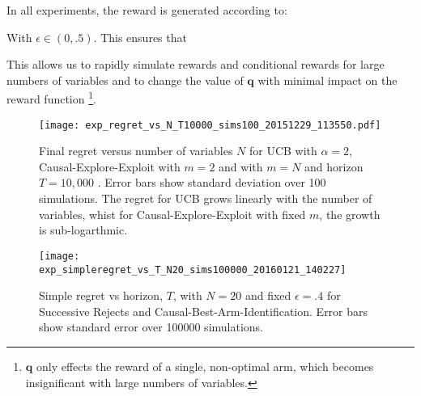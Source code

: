 In all experiments, the reward is generated according to:

With $\epsilon \in (0,.5)$. This ensures that 

This allows us to rapidly simulate rewards and conditional rewards for large numbers of variables and to change the value of $\boldsymbol{q}$ with minimal impact on the reward function \footnote{$\boldsymbol{q}$ only effects the reward of a single, non-optimal arm, which becomes insignificant with large numbers of variables.}. 

\begin{figure}
\caption{Final regret versus number of variables $N$ for UCB with $\alpha = 2$, Causal-Explore-Exploit with $m=2$ and with $m=N$ and horizon $T = 10,000$ . Error bars show standard deviation over 100 simulations. The regret for UCB grows linearly with the number of variables, whist for Causal-Explore-Exploit with fixed $m$, the growth is sub-logarthmic.  }
\label{fig:known_q_r_vs_N}
\centering
\texttt{[image: exp\_regret\_vs\_N\_T10000\_sims100\_20151229\_113550.pdf]}
\end{figure}

\iffalse
\begin{figure}
\caption{Cumulative regret over time for $N = 17$ for UCB with $\alpha=2$, Causal-Explore-Exploit with $m=2$ and Causal-Explore-Exploit with $m=N$. Shaded region shows standard deviation over 100 simulations. The Causal-Explore-Exploit algorithm incurs linear regret during the exploration phase, after which it selects the optimal arm with high probability. For $m=2$, we have $K \sim m^{2/3}T^{1/3}$ and see that we are in the regime in which Causal-Explore-Exploit outperforms UCB.}
\label{fig:known_q_r_vs_t}
\centering
\texttt{[image: exp\_regret\_vs\_t\_T10000\_N17\_sims100\_20151229\_120647.pdf]}
\end{figure}
\fi

\begin{figure}
\caption{Simple regret vs horizon, $T$, with $N = 20$ and fixed $\epsilon = .4$ for Successive Rejects and Causal-Best-Arm-Identification. Error bars show standard error over 100000 simulations.}
\label{fig:simple_vs_T}
\centering
\texttt{[image: exp\_simpleregret\_vs\_T\_N20\_sims100000\_20160121\_140227]}
\end{figure}

